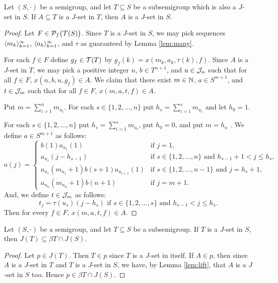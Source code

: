 \begin{lem}
  \label{lem:lift}
  Let $(S, \cdot)$ be a semigroup, and let $T \subseteq S$ be a subsemigroup which is also a $J$-set in $S$.
  If $A \subseteq T$ is a $J$-set in $T$, then $A$ is a $J$-set in $S$.
\end{lem}
\begin{proof}
  Let $F \in \mathcal{P}_f\bigl( \mathcal{T}(S) \bigr)$.
  Since $T$ is a $J$-set in $S$, we may pick sequences $\langle m_k \rangle_{k=1}^\infty$, $\langle a_k \rangle_{k=1}^\infty$, and $\tau$ as guaranteed by Lemma \ref{lem:many}.

  For each $f \in F$ define $g_f \in \mathcal{T}(T)$ by $g_f(k) = x(m_k, a_k, \tau(k), f)$. 
  Since $A$ is a $J$-set in $T$, we may pick a positive integer $n$, $b \in T^{n+1}$, and $u \in \mathcal{J}_n$ such that for all $f \in F$, $x(n, b, u, g_f) \in A$.
  We claim that there exist $m \in \mathbb{N}$, $a \in S^{m+1}$, and $t \in \mathcal{J}_m$ such that for all $f \in F$, $x(m, a, t, f) \in A$.

  Put $m = \sum_{i=1}^n m_{u_i}$. 
  For each $s \in \{1, 2, \ldots, n\}$ put $h_s = \sum_{i=1}^s m_{u_i}$ and let $h_0 = 1$. 

  For each $s \in \{1, 2, \ldots, n\}$ put $h_s = \sum_{i=1}^s m_{u_i}$, put $h_0 = 0$, and put $m = h_n$ .
  We define $a \in S^{m+1}$ as follows:
  \[
    a(j) =
    \begin{cases}
      b(1)a_{u_1}(1) & \mbox{if $j=1$,} \\
      a_{u_s}(j-h_{s-1}) & \mbox{if $s \in \{1, 2, \ldots, n\}$ and $h_{s-1} + 1 < j \le h_s$,} \\
      a_{u_s}(m_{u_s}+1)b(s+1)a_{u_{s+1}}(1) & \mbox{if $s \in \{1, 2, \ldots, n-1\}$ and $j = h_s + 1$,} \\
      a_{u_n}(m_{u_n}+1)b(n+1) & \mbox{if $j = m+1$.}
    \end{cases}
  \]
  And, we define $t \in \mathcal{J}_m$ as follows:
  \[
    t_j = 
      \mbox{$\tau(u_s)(j- h_s)$ if $s \in \{1, 2, \ldots, s\}$ and $h_{s-1} < j \le h_s$.}
  \]
  Then for every $f \in F$, $x(m, a, t, f) \in A$.
\end{proof}

\begin{thm}
  \label{thm:comb-ideal}
  Let $(S, \cdot)$ be a semigroup, and let $T \subseteq S$ be a subsemigroup.
  If $T$ is a $J$-set in $S$, then $J(T) \subseteq \beta T \cap J(S)$.
\end{thm}
\begin{proof}
  Let $p \in J(T)$.
  Then $T \in p$ since $T$ is a $J$-set in itself.
  If $A \in p$, then since $A$ is a $J$-set in $T$ and $T$ is a $J$-set in $S$, we have, by Lemma \ref{lem:lift}, that $A$ is a $J$-set in $S$ too.
  Hence $p \in \beta T \cap J(S)$. 
\end{proof}

